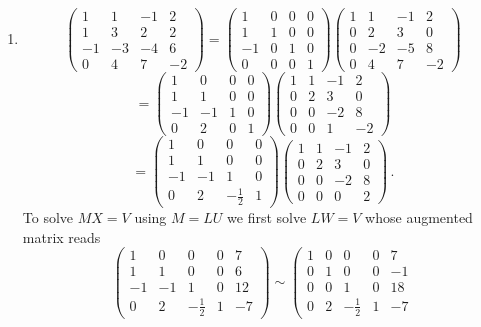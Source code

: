\begin{enumerate}
\item
$$
\begin{pmatrix}
1&1&-1&2\\
1&3&2&2\\
-1&-3&-4&6\\
0&4&7&-2
\end{pmatrix}
=
\begin{pmatrix}
1&0&0&0\\
1&1&0&0\\
-1&0&1&0\\
0&0&0&1
\end{pmatrix}
\begin{pmatrix}
1&1&-1&2\\
0&2&3&0\\
0&-2&-5&8\\
0&4&7&-2
\end{pmatrix}
$$
$$
=
\begin{pmatrix}
1&0&0&0\\
1&1&0&0\\
-1&-1&1&0\\
0&2&0&1
\end{pmatrix}
\begin{pmatrix}
1&1&-1&2\\
0&2&3&0\\
0&0&-2&8\\
0&0&1&-2
\end{pmatrix}
$$ $$=
\begin{pmatrix}
1&0&0&0\\
1&1&0&0\\
-1&-1&1&0\\
0&2&-\frac12&1
\end{pmatrix}
\begin{pmatrix}
1&1&-1&2\\
0&2&3&0\\
0&0&-2&8\\
0&0&0&2
\end{pmatrix}\, .
$$
To solve $MX=V$ using $M=LU$ we first solve $LW=V$ whose augmented matrix reads
$$
\left(
\begin{array}{cccc|c}
1&0&0&0&7\\
1&1&0&0&6\\
-1&-1&1&0&12\\
0&2&-\frac12&1&-7
\end{array}\right)
\sim 
\left(
\begin{array}{cccc|c}
1&0&0&0&7\\
0&1&0&0&-1\\
0&0&1&0&18\\
0&2&-\frac12&1&-7

\end{array}$$
\end{enumerate}
